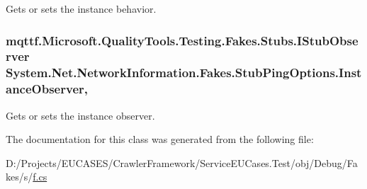 Gets or sets the instance behavior.

\hypertarget{class_system_1_1_net_1_1_network_information_1_1_fakes_1_1_stub_ping_options_a08f4da0c9c39b08afa3ce5a478caf7e5}{
\subsubsection[{Instance\-Observer}]{\setlength{\rightskip}{0pt plus 5cm}mqttf.\-Microsoft.\-Quality\-Tools.\-Testing.\-Fakes.\-Stubs.\-I\-Stub\-Observer System.\-Net.\-Network\-Information.\-Fakes.\-Stub\-Ping\-Options.\-Instance\-Observer\hspace{0.3cm}{\ttfamily [get]}, {\ttfamily [set]}}}\label{class_system_1_1_net_1_1_network_information_1_1_fakes_1_1_stub_ping_options_a08f4da0c9c39b08afa3ce5a478caf7e5}


Gets or sets the instance observer.



The documentation for this class was generated from the following file\-:\begin{DoxyCompactItemize}
\item 
D\-:/\-Projects/\-E\-U\-C\-A\-S\-E\-S/\-Crawler\-Framework/\-Service\-E\-U\-Cases.\-Test/obj/\-Debug/\-Fakes/s/\hyperlink{s_2f_8cs}{f.\-cs}\end{DoxyCompactItemize}
